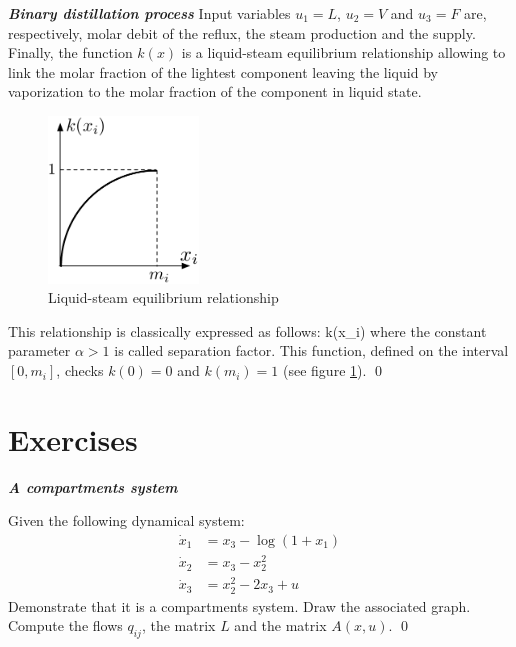 \begin{exemple}{\bf \em Binary distillation process}
Input variables $u_1 = L$, $u_2 = V$ and $u_3 = F$ are, respectively, molar debit of the reflux, the steam production and the supply.
Finally, the function $k(x)$ is a liquid-steam equilibrium relationship allowing to link the molar fraction of the lightest component
leaving the liquid by vaporization to the molar fraction of the component in liquid state. 
\begin{figure}[ht]
\begin{center}
\includegraphics[width=4cm]{images/separ}
\caption{Liquid-steam equilibrium relationship}
\label{Fig:separ}
\end{center} 
\end{figure}

\noindent This relationship is classically expressed as follows:
\eqnn
k(x_i) \triangleq {}
\eeqnn
where the constant parameter $\alpha > 1$ is called separation factor.
This function, defined on the interval $[0,m_i]$, checks $k(0) = 0$ and
$k(m_i) = 1$ (see figure \ref{Fig:separ}). \qed  
\end{exemple}

\section{Exercises}

\begin{exercice}{\bf \em A compartments system}

Given the following dynamical system:
\begin{align*}
\dot x_{1} &= x_{3} - \log (1+x_{1}) \\
\dot x_{2} &= x_{3} - x_{2}^2 \\
\dot x_{3} &= x_{2}^2 - 2x_{3} + u
\end{align*}
Demonstrate that it is a compartments system. Draw the associated graph. Compute the flows $q_{ij}$, the matrix $L$ and the matrix $A(x,u)$. \qed
\end{exercice}
\vv

